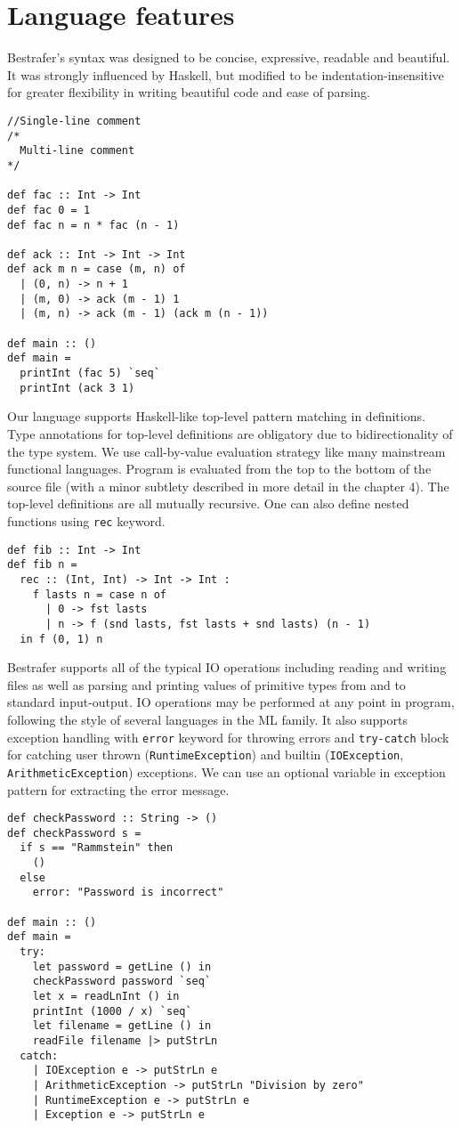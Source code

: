 \documentclass[declaration,shortabstract,english]{iithesis}
\begin{document}
\section{Language features}
Bestrafer's syntax was designed to be concise, expressive, readable and beautiful.
It was strongly influenced by Haskell, but modified to be indentation-insensitive for greater
flexibility in writing beautiful code and ease of parsing.
\begin{verbatim}
//Single-line comment
/*
  Multi-line comment
*/

def fac :: Int -> Int
def fac 0 = 1
def fac n = n * fac (n - 1)

def ack :: Int -> Int -> Int
def ack m n = case (m, n) of
  | (0, n) -> n + 1
  | (m, 0) -> ack (m - 1) 1
  | (m, n) -> ack (m - 1) (ack m (n - 1))

def main :: ()
def main =
  printInt (fac 5) `seq`
  printInt (ack 3 1)
\end{verbatim}
Our language supports Haskell-like top-level pattern matching in definitions. Type annotations
for top-level definitions are obligatory due to bidirectionality of the type system.
We use call-by-value evaluation strategy like many mainstream functional languages.
Program is evaluated from the top to the bottom of the source file
(with a minor subtlety described in more detail in the chapter 4). The top-level definitions
are all mutually recursive. One can also define nested functions using \verb+rec+ keyword.
\begin{verbatim}
def fib :: Int -> Int
def fib n =
  rec :: (Int, Int) -> Int -> Int :
    f lasts n = case n of
      | 0 -> fst lasts
      | n -> f (snd lasts, fst lasts + snd lasts) (n - 1)
  in f (0, 1) n
\end{verbatim}

Bestrafer supports all of the typical IO operations including reading and writing files as well as
parsing and printing values of primitive types from and to standard input-output.
IO operations may be performed at any point in program, following the style of
several languages in the ML family. It also supports exception handling with \verb+error+
keyword for throwing errors and \verb+try-catch+ block for catching
user thrown (\verb+RuntimeException+) and builtin (\verb+IOException+,
\verb+ArithmeticException+) exceptions. We can use an optional variable in exception pattern
for extracting the error message.
\begin{verbatim}
def checkPassword :: String -> ()
def checkPassword s =
  if s == "Rammstein" then
    ()
  else
    error: "Password is incorrect"

def main :: ()
def main =
  try:
    let password = getLine () in
    checkPassword password `seq`
    let x = readLnInt () in
    printInt (1000 / x) `seq`
    let filename = getLine () in
    readFile filename |> putStrLn
  catch:
    | IOException e -> putStrLn e
    | ArithmeticException -> putStrLn "Division by zero"
    | RuntimeException e -> putStrLn e
    | Exception e -> putStrLn e
\end{verbatim}
\end{document}
